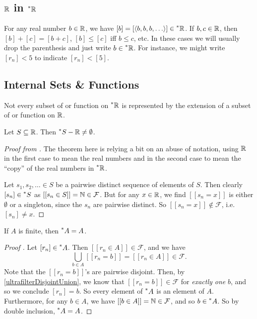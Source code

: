 \subsection{\texorpdfstring{$\mathbb{R}$}{R} in \texorpdfstring{$\prescript{*}{}{\mathbb{R}}$}{*R}}
For any real number $b \in \mathbb{R}$, we have $[b] = [\langle b, b, b, \ldots \rangle] \in \prescript{*}{}{\mathbb{R}}$. If $b, c \in \mathbb{R}$, then $[b] + [c] = [b + c]$, $[b] \leq [c]$ iff $b \leq c$, etc. In these cases we will usually drop the parenthesis and just write $b \in \prescript{*}{}{\mathbb{R}}$. For instance, we might write $[r_n] < 5$ to indicate $[r_n] < [5]$.

\subsection{Internal Sets \& Functions}
Not every subset of or function on $\prescript{*}{}{\mathbb{R}}$ is represented by the extension of a subset of or function on $\mathbb{R}$.

\begin{thm}
    Let $S \subseteq \mathbb{R}$. Then $\prescript{*}{}{S} - \mathbb{R} \neq \emptyset$.
\end{thm}

\begin{proof}[Proof from ]
    The theorem here is relying a bit on an abuse of notation, using $\mathbb{R}$ in the first case to mean the real numbers and in the second case to mean the ``copy'' of the real numbers in $\prescript{*}{}{\mathbb{R}}$.

    Let $s_1, s_2, \ldots \in S$ be a pairwise distinct sequence of elements of $S$. Then clearly $[s_n] \in \prescript{*}{}{S}$ as $[[s_n \in S]] = \mathbb{N} \in \mathcal{F}$. But for any $x \in \mathbb{R}$, we find $[[s_n = x]]$ is either $\emptyset$ or a singleton, since the $s_n$ are pairwise distinct. So $[[s_n = x]] \notin \mathcal{F}$, i.e. $[s_n] \neq x$.
\end{proof}

\begin{thm}
    If $A$ is finite, then $\prescript{*}{}{A} = A$.
\end{thm}

\begin{proof}[Proof ]
    Let $[r_n] \in \prescript{*}{}{A}$. Then $[[r_n \in A]] \in \mathcal{F}$, and we have 
    \[ \bigcup_{b \in A} [[r_n = b]] = [[r_n \in A]] \in \mathcal{F}. \]
    Note that the $[[r_n = b]]$'s are pairwise disjoint. Then, by \autoref{ultrafilterDisjointUnion}, we know that $[[r_n = b]] \in \mathcal{F}$ for \textit{exactly one} $b$, and so we conclude $[r_n] = b$. So every element of $\prescript{*}{}{A}$ is an element of $A$. Furthermore, for any $b \in A$, we have $[[b \in A]] = \mathbb{N} \in \mathcal{F}$, and so $b \in \prescript{*}{}{A}$. So by double inclusion, $\prescript{*}{}{A} = A$. 
\end{proof}

